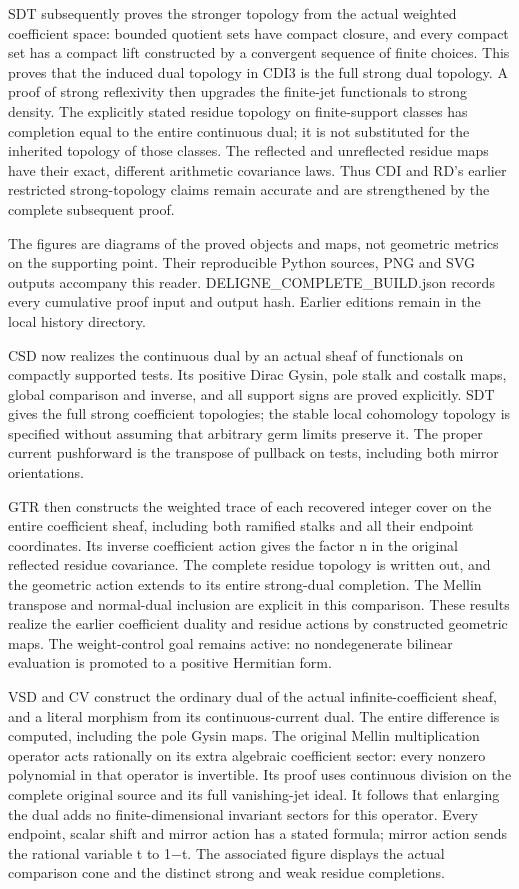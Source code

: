 \documentclass[
]{report}
\begin{document}
SDT subsequently proves the stronger topology from the actual weighted
coefficient space: bounded quotient sets have compact closure, and every
compact set has a compact lift constructed by a convergent sequence of
finite choices. This proves that the induced dual topology in CDI3 is
the full strong dual topology. A proof of strong reflexivity then
upgrades the finite-jet functionals to strong density. The explicitly
stated residue topology on finite-support classes has completion equal
to the entire continuous dual; it is not substituted for the inherited
topology of those classes. The reflected and unreflected residue maps
have their exact, different arithmetic covariance laws. Thus CDI and
RD's earlier restricted strong-topology claims remain accurate and are
strengthened by the complete subsequent proof.

The figures are diagrams of the proved objects and maps, not geometric
metrics on the supporting point. Their reproducible Python sources, PNG
and SVG outputs accompany this reader. DELIGNE\_COMPLETE\_BUILD.json
records every cumulative proof input and output hash. Earlier editions
remain in the local history directory.

CSD now realizes the continuous dual by an actual sheaf of functionals
on compactly supported tests. Its positive Dirac Gysin, pole stalk and
costalk maps, global comparison and inverse, and all support signs are
proved explicitly. SDT gives the full strong coefficient topologies; the
stable local cohomology topology is specified without assuming that
arbitrary germ limits preserve it. The proper current pushforward is the
transpose of pullback on tests, including both mirror orientations.

GTR then constructs the weighted trace of each recovered integer cover
on the entire coefficient sheaf, including both ramified stalks and all
their endpoint coordinates. Its inverse coefficient action gives the
factor n in the original reflected residue covariance. The complete
residue topology is written out, and the geometric action extends to its
entire strong-dual completion. The Mellin transpose and normal-dual
inclusion are explicit in this comparison. These results realize the
earlier coefficient duality and residue actions by constructed geometric
maps. The weight-control goal remains active: no nondegenerate bilinear
evaluation is promoted to a positive Hermitian form.

VSD and CV construct the ordinary dual of the actual
infinite-coefficient sheaf, and a literal morphism from its
continuous-current dual. The entire difference is computed, including
the pole Gysin maps. The original Mellin multiplication operator acts
rationally on its extra algebraic coefficient sector: every nonzero
polynomial in that operator is invertible. Its proof uses continuous
division on the complete original source and its full vanishing-jet
ideal. It follows that enlarging the dual adds no finite-dimensional
invariant sectors for this operator. Every endpoint, scalar shift and
mirror action has a stated formula; mirror action sends the rational
variable t to 1−t. The associated figure displays the actual comparison
cone and the distinct strong and weak residue completions.
\end{document}

